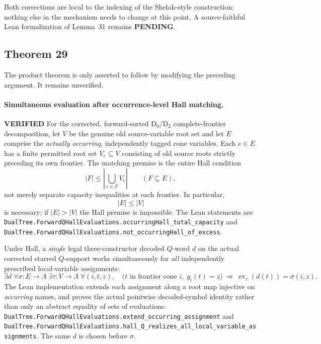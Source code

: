 \documentclass[11pt]{article}
\newcommand{\ok}{\textcolor{green!40!black}{\textbf{VERIFIED}}}
\newcommand{\todo}{\textcolor{gray!70!black}{\textbf{PENDING}}}
\newcommand{\lean}[1]{\texttt{#1}}
\begin{document}
Both corrections are local to the indexing of the Shelah-style construction;
nothing else in the mechanism needs to change at this point.  A source-faithful
Lean formalization of Lemma~31 remains \todo.

\subsection{Theorem 29}
The product theorem is only asserted to follow by modifying the preceding
argument.  It remains unverified.


\paragraph{Simultaneous evaluation after occurrence-level Hall matching.} \ok
For the corrected, forward-sorted D$_0$/D$_2$ complete-frontier
decomposition, let $V$ be the genuine old source-variable root set and let
$E$ comprise the \emph{actually occurring}, independently tagged cone
variables. Each $e\in E$ has a finite permitted root set $V_e\subseteq V$
consisting of old source roots strictly preceding its own frontier. The
matching premise is the entire Hall condition
\[
  |F|\leq\left|\bigcup_{e\in F}V_e\right|
  \qquad(F\subseteq E),
\]
not merely separate capacity inequalities at each frontier. In particular,
\[
  |E|\leq |V|
\]
is necessary; if $|E|>|V|$ the Hall premise is impossible. The Lean
statements are
\lean{DualTree.ForwardQHallEvaluations.occurringHall_total_capacity}
and
\lean{DualTree.ForwardQHallEvaluations.not_occurringHall_of_excess}.

Under Hall, a \emph{single} legal three-constructor decoded $Q$-word
$d$ on the actual corrected starred $Q$-support works simultaneously
for \emph{all} independently prescribed local-variable assignments:
\[
 \exists d\;\forall \sigma:E\to\Lambda\;
 \exists\tau:V\to\Lambda\;\forall(i,t,z),\quad
  \bigl(t\text{ in frontier cone }i,\;
    g_i(t)=z\bigr)
 \ \Longrightarrow\
   \operatorname{ev}_{\tau}(d(t))=\sigma(i,z).
\]
The Lean implementation extends each assignment along a root map
injective on \emph{occurring} names, and proves the actual pointwise
decoded-symbol identity rather than only an abstract equality of
sets of evaluations:
\lean{DualTree.ForwardQHallEvaluations.extend_occurring_assignment}
and
\lean{DualTree.ForwardQHallEvaluations.hall_Q_realizes_all_local_variable_assignments}.
The same $d$ is chosen before $\sigma$.
\end{document}
